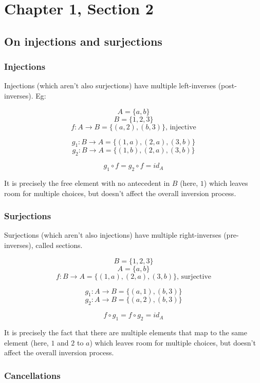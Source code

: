 \chapter*{Chapter 1, Section 2}

\section*{On injections and surjections}

\subsection*{Injections}

Injections (which aren't also surjections) have multiple left-inverses (post-inverses). Eg:

$$A = \{ a, b    \}$$
$$B = \{ 1, 2, 3 \}$$
$$f : A \to B = \{ (a, 2), (b, 3) \} \text{, injective}$$

$$g_1 : B \to A = \{ (1, a), (2, a), (3, b) \}$$
$$g_2 : B \to A = \{ (1, b), (2, a), (3, b) \}$$

$$g_1 \circ f = g_2 \circ f = id_A$$

It is precisely the free element with no antecedent in $B$ (here, $1$) which leaves room for multiple choices, but doesn't affect the overall inversion process.


\subsection*{Surjections}

Surjections (which aren't also injections) have multiple right-inverses (pre-inverses), called sections.



$$B = \{ 1, 2, 3 \}$$
$$A = \{ a, b    \}$$
$$f : B \to A = \{ (1, a), (2, a), (3, b) \} \text{, surjective}$$

$$g_1 : A \to B = \{(a, 1), (b, 3) \}$$
$$g_2 : A \to B = \{(a, 2), (b, 3) \}$$

$$f \circ g_1 = f \circ g_2 = id_A$$

It is precisely the fact that there are multiple elements that map to the same element (here, $1$ and $2$ to $a$) which leaves room for multiple choices, but doesn't affect the overall inversion process.



\subsection*{Cancellations}

